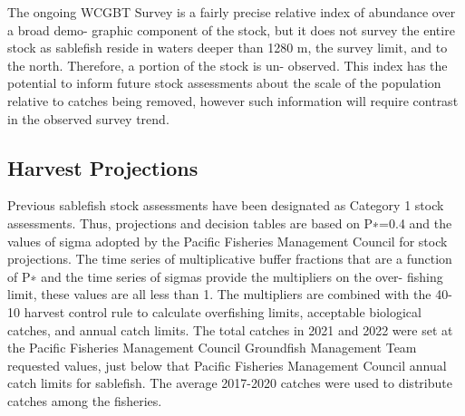 \documentclass[11pt,
  english,
  a4paper,
]{article}
\begin{document}
\leavevmode\tagmcend\tagstructend\par


The ongoing WCGBT Survey is a fairly precise relative index of abundance over a broad demo- graphic component of the stock, but it does not survey the entire stock as sablefish reside in waters deeper than 1280 m, the survey limit, and to the north. Therefore, a portion of the stock is un- observed. This index has the potential to inform future stock assessments about the scale of the population relative to catches being removed, however such information will require contrast in the observed survey trend.

\leavevmode\tagmcend\tagstructend\par


\hypertarget{harvest-projections}{%
\subsection*{Harvest Projections}\label{harvest-projections}}

\leavevmode\tagmcend\tagstructend


Previous sablefish stock assessments have been designated as Category 1 stock assessments. Thus, projections and decision tables are based on P∗=0.4 and the values of sigma adopted by the Pacific Fisheries Management Council for stock projections. The time series of multiplicative buffer fractions that are a function of P∗ and the time series of sigmas provide the multipliers on the over- fishing limit, these values are all less than 1. The multipliers are combined with the 40-10 harvest control rule to calculate overfishing limits, acceptable biological catches, and annual catch limits. The total catches in 2021 and 2022 were set at the Pacific Fisheries Management Council Groundfish Management Team requested values, just below that Pacific Fisheries Management Council annual catch limits for sablefish. The average 2017-2020 catches were used to distribute catches among the fisheries.

\leavevmode\tagmcend\tagstructend\par

\end{document}
